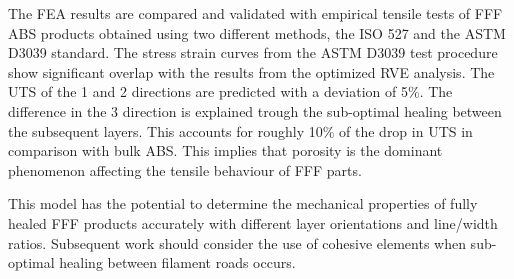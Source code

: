 The FEA results are compared and validated with empirical tensile tests of FFF ABS products obtained using two different methods, the ISO 527 and the ASTM D3039 standard. The stress strain curves from the ASTM D3039 test procedure show significant overlap with the results from the optimized RVE analysis. The UTS of the 1 and 2 directions are predicted with a deviation of 5\%. The difference in the 3 direction is explained trough the sub-optimal healing between the subsequent layers. This accounts for roughly 10\% of the drop in UTS in comparison with bulk ABS.  This implies that porosity is the dominant phenomenon affecting the tensile behaviour of FFF parts. 

This model has the potential to determine the mechanical properties of fully healed FFF products accurately with different layer orientations and line/width ratios. Subsequent work should consider the use of cohesive elements when sub-optimal healing between filament roads occurs.



